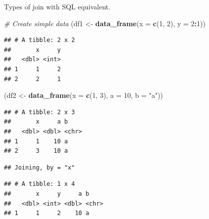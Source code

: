 \documentclass[]{book}
\newenvironment{Shaded}{\begin{snugshade}}{\end{snugshade}}
\newcommand{\KeywordTok}[1]{\textcolor[rgb]{0.13,0.29,0.53}{\textbf{#1}}}
\newcommand{\DataTypeTok}[1]{\textcolor[rgb]{0.13,0.29,0.53}{#1}}
\newcommand{\DecValTok}[1]{\textcolor[rgb]{0.00,0.00,0.81}{#1}}
\newcommand{\StringTok}[1]{\textcolor[rgb]{0.31,0.60,0.02}{#1}}
\newcommand{\CommentTok}[1]{\textcolor[rgb]{0.56,0.35,0.01}{\textit{#1}}}
\newcommand{\OperatorTok}[1]{\textcolor[rgb]{0.81,0.36,0.00}{\textbf{#1}}}
\newcommand{\NormalTok}[1]{#1}
\theoremstyle{definition}
\theoremstyle{definition}
\theoremstyle{definition}
\theoremstyle{remark}
\begin{document}
Types of join with SQL equivalent.

\begin{Shaded}
\begin{Highlighting}[]
\CommentTok{# Create simple data}
\NormalTok{(df1 <-}\StringTok{ }\KeywordTok{data_frame}\NormalTok{(}\DataTypeTok{x =} \KeywordTok{c}\NormalTok{(}\DecValTok{1}\NormalTok{, }\DecValTok{2}\NormalTok{), }\DataTypeTok{y =} \DecValTok{2}\OperatorTok{:}\DecValTok{1}\NormalTok{))}
\end{Highlighting}
\end{Shaded}

\begin{verbatim}
## # A tibble: 2 x 2
##       x     y
##   <dbl> <int>
## 1     1     2
## 2     2     1
\end{verbatim}

\begin{Shaded}
\begin{Highlighting}[]
\NormalTok{(df2 <-}\StringTok{ }\KeywordTok{data_frame}\NormalTok{(}\DataTypeTok{x =} \KeywordTok{c}\NormalTok{(}\DecValTok{1}\NormalTok{, }\DecValTok{3}\NormalTok{), }\DataTypeTok{a =} \DecValTok{10}\NormalTok{, }\DataTypeTok{b =} \StringTok{"a"}\NormalTok{))}
\end{Highlighting}
\end{Shaded}

\begin{verbatim}
## # A tibble: 2 x 3
##       x     a b    
##   <dbl> <dbl> <chr>
## 1     1    10 a    
## 2     3    10 a
\end{verbatim}

\begin{Shaded}
\end{Shaded}

\begin{verbatim}
## Joining, by = "x"
\end{verbatim}

\begin{verbatim}
## # A tibble: 1 x 4
##       x     y     a b    
##   <dbl> <int> <dbl> <chr>
## 1     1     2    10 a
\end{verbatim}

\begin{Shaded}
\end{Shaded}
\end{document}
